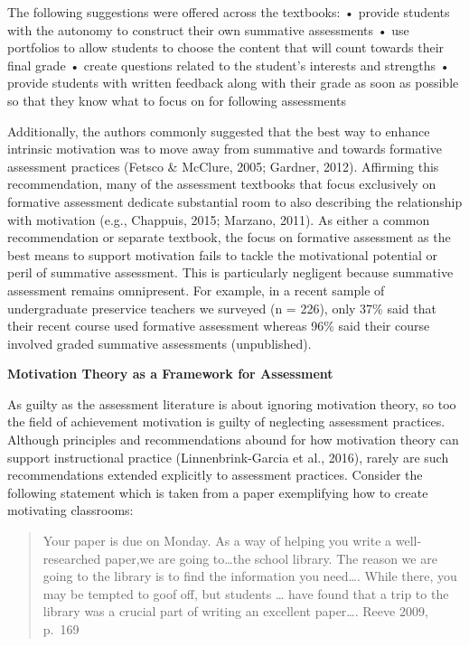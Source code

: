 \documentclass[
]{book}
\begin{document}
The following suggestions were offered across the textbooks:
• provide students with the autonomy to construct their own summative assessments
• use portfolios to allow students to choose the content that will count towards their final grade
• create questions related to the student's interests and strengths
• provide students with written feedback along with their grade as soon as possible so that they know what to focus on for following assessments

Additionally, the authors commonly suggested that the best way to enhance intrinsic motivation was to move away from summative and towards formative assessment practices (Fetsco \& McClure, 2005; Gardner, 2012). Affirming this recommendation, many of the assessment textbooks that focus exclusively on formative assessment dedicate substantial room to also describing the relationship with motivation (e.g., Chappuis, 2015; Marzano, 2011). As either a common recommendation or separate textbook, the focus on formative assessment as the best means to support motivation fails to tackle the motivational potential or peril of summative assessment. This is particularly negligent because summative assessment remains omnipresent. For example, in a recent sample of undergraduate preservice teachers we surveyed (n = 226), only 37\% said that their recent course used formative assessment whereas 96\% said their course involved graded summative assessments (unpublished).

\textbf{Motivation Theory as a Framework for Assessment}

As guilty as the assessment literature is about ignoring motivation theory, so too the field of achievement motivation is guilty of neglecting assessment practices. Although principles and recommendations abound for how motivation theory can support instructional practice (Linnenbrink-Garcia et al., 2016), rarely are such recommendations extended explicitly to assessment practices. Consider the following statement which is taken from a paper exemplifying how to create motivating classrooms:

\begin{quote}
Your paper is due on Monday. As a way of helping you write a well-researched paper,we are going to\ldots the school library. The reason we are going to the library is to find the information you need\ldots. While there, you may be tempted to goof off, but students \ldots{} have found that a trip to the library was a crucial part of writing an excellent paper\ldots. Reeve 2009, p.~169
\end{quote}
\end{document}
